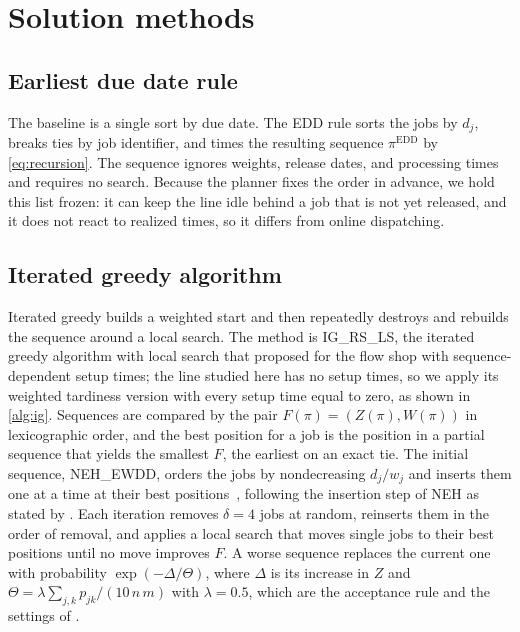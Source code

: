 \section{Solution methods}\label{sec:methods}

\subsection{Earliest due date rule}\label{sec:edd}

\sumpara The baseline is a single sort by due date. \sumparaend
\fin The EDD rule sorts the jobs by $d_j$, breaks ties by job identifier, and times the resulting sequence $\pi^{\mathrm{EDD}}$ by \eqref{eq:recursion}. \fine
\fin The sequence ignores weights, release dates, and processing times and requires no search. \fine
\fin Because the planner fixes the order in advance, we hold this list frozen: it can keep the line idle behind a job that is not yet released, and it does not react to realized times, so it differs from online dispatching. \fine

\subsection{Iterated greedy algorithm}\label{sec:ig}

\sumpara Iterated greedy builds a weighted start and then repeatedly destroys and rebuilds the sequence around a local search. \sumparaend
\fin The method is IG\_RS\_LS, the iterated greedy algorithm with local search that \citet{ruiz2008igwt} proposed for the flow shop with sequence-dependent setup times; the line studied here has no setup times, so we apply its weighted tardiness version with every setup time equal to zero, as shown in \cref{alg:ig}. \fine
\fin Sequences are compared by the pair $F(\pi) = (Z(\pi), W(\pi))$ in lexicographic order, and the best position for a job is the position in a partial sequence that yields the smallest $F$, the earliest on an exact tie. \fine
\fin The initial sequence, NEH\_EWDD, orders the jobs by nondecreasing $d_j / w_j$ and inserts them one at a time at their best positions~\cite{ruiz2008igwt}, following the insertion step of NEH as stated by \citet{ruiz2007ig}. \fine
\fin Each iteration removes $\delta = 4$ jobs at random, reinserts them in the order of removal, and applies a local search that moves single jobs to their best positions until no move improves $F$. \fine
\fin A worse sequence replaces the current one with probability $\exp(-\Delta/\Theta)$, where $\Delta$ is its increase in $Z$ and $\Theta = \lambda \sum_{j,k} p_{jk} / (10\, n\, m)$ with $\lambda = 0.5$, which are the acceptance rule and the settings of \citet{ruiz2008igwt}. \fine

